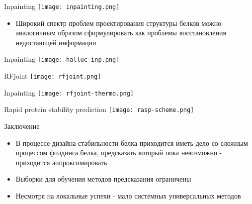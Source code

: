 \begin{frame}{Inpainting}
    \centering
    \texttt{[image: inpainting.png]}
    \begin{itemize}
        \item Широкий спектр проблем проектирования структуры белков можно аналогичным образом сформулировать как проблемы восстановления недостающей информации 
        \end{itemize}

\end{frame}


\begin{frame}{Inpainting}
    \centering
    \texttt{[image: halluc-inp.png]}

\end{frame}

\begin{frame}{RFjoint}
    \centering
    \texttt{[image: rfjoint.png]}

\end{frame}

\begin{frame}{Inpainting}
    \centering
    \texttt{[image: rfjoint-thermo.png]}

\end{frame}

\begin{frame}{Rapid protein stability prediction}
    \centering
    \texttt{[image: rasp-scheme.png]}
\end{frame}
\begin{frame}{Заключение}
    \begin{itemize}
        \item  В процессе дизайна стабильности белка приходится иметь дело со сложным процессом фолдинга белка, предсказать который пока невозможно - приходится аппроксимировать
        \item Выборки для обучения методов предсказания ограничены
        \item  Несмотря на локальные успехи - мало системных универсальных методов
    \end{itemize}
\end{frame}


